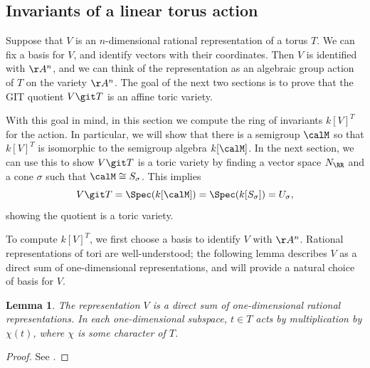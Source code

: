 \documentclass[12pt]{amsart}
\theoremstyle{plain}
\newtheorem{definition}[theorem]{Definition}
\newtheorem{lemma}[theorem]{Lemma}
\begin{document}
%
%













\newpage
\subsection{Invariants of a linear torus action}\label{section:invariantsoftorus}
Suppose that $V$ is an $n$-dimensional rational representation of a torus $T$.
We can fix a basis for $V$, and identify vectors with their coordinates.
Then $V$ is identified with $\AA^n$, and we can think of the representation as an algebraic group action of $T$ on the variety $\AA^n$.
The goal of the next two sections is to prove that the GIT quotient $V \git T$ is an affine toric variety.

With this goal in mind, in this section we compute the ring of invariants $k[V]^T$ for the action.
In particular, we will show that there is a semigroup $\calM$ so that $k[V]^T$ is isomorphic to the semigroup algebra $k[\calM]$.
In the next section, we can use this to show $V \git T$ is a toric variety by finding a vector space $N_\RR$ and a cone $\sigma$ such that $\calM \cong S_\sigma$.
This implies
$$V \git T = \Spec(k[\calM]) = \Spec(k[S_\sigma]) = U_\sigma,$$
showing the quotient is a toric variety.

To compute $k[V]^T$, we first choose a basis to identify $V$ with $\AA^n$.
Rational representations of tori are well-understood; the following lemma describes $V$ as a direct sum of one-dimensional representations, and will provide a natural choice of basis for $V$.

\begin{lemma}
The representation $V$ is a direct sum of one-dimensional rational representations.
In each one-dimensional subspace, $t \in T$ acts by multiplication by $\chi(t)$, where $\chi$ is some character of $T$.
\end{lemma}
\begin{proof}
See \cite[3.2.3]{Springer98}.
\end{proof}
\end{document}
